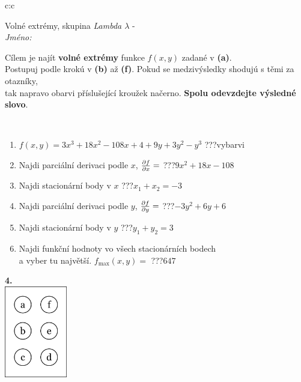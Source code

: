 \documentclass[10pt]{report}
\begin{document}
\begin{tabular}{c:c}
\begin{minipage}[c][104.5mm][t]{0.5\linewidth}
\begin{center}
\vspace{7mm}
{\huge Volné extrémy, skupina \textit{Lambda $\lambda$} -}\\[5mm]
\textit{Jméno:}\phantom{xxxxxxxxxxxxxxxxxxxxxxxxxxxxxxxxxxxxxxxxxxxxxxxxxxxxxxxxxxxxxxxxx}\\[5mm]
\begin{minipage}{0.95\linewidth}
\begin{center}
Cílem je najít \textbf{volné extrémy} funkce $f(x,y)$ zadané v \textbf{(a)}.\\Postupuj podle krokú v \textbf{(b)} až \textbf{(f)}. Pokud se medzivýsledky shodujú s těmi za otazníky,\\tak napravo obarvi příslušející kroužek načerno. \textbf{Spolu odevzdejte výsledné slovo}.
\end{center}
\end{minipage}
\\[1mm]
\begin{minipage}{0.79\linewidth}
\begin{center}
\begin{varwidth}{\linewidth}
\begin{enumerate}
\normalsize
\item $f(x,y)=3x^3+18x^2-108x+4+9y+3y^2-y^3$\quad \dotfill\; ???\;\dotfill \quad vybarvi
\item Najdi parciální derivaci podle $x$, $\pdv{f}{x}=$\quad \dotfill\; ???\;\dotfill \quad $9x^2+18x-108$
\item Najdi stacionární body v $x$\quad \dotfill\; ???\;\dotfill \quad $x_1+x_2=-3$
\item Najdi parciální derivaci podle $y$, $\pdv{f}{y}=$\quad \dotfill\; ???\;\dotfill \quad $-3y^2+6y+6$
\item Najdi stacionární body v $y$\quad \dotfill\; ???\;\dotfill \quad $y_1+y_2=3$
\item Najdi funkční hodnoty vo všech stacionárních bodech \\ \phantom{xxxxxx} a vyber tu najvětší. $f_{\text{max}}(x,y)=$\quad \dotfill\; ???\;\dotfill \quad $647$
\end{enumerate}
\end{varwidth}
\end{center}
\end{minipage}
\begin{minipage}{0.20\linewidth}
\begin{center}
{\Huge\bfseries 4.} \\[2mm]
\includegraphics[height=40mm]{../images/braille.png}

\end{center}
\end{minipage}
\end{center}
\end{minipage}
\end{tabular}
\end{document}
